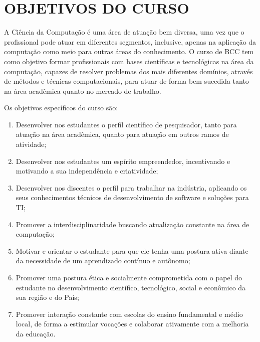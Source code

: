 \chapter{OBJETIVOS DO CURSO}

A Ciência da Computação é uma área de atuação bem diversa, uma vez que o profissional pode atuar em diferentes segmentos, inclusive, apenas na aplicação da computação como meio para outras áreas do conhecimento. O curso de BCC tem como objetivo formar profissionais com bases científicas e tecnológicas na área da computação, capazes de resolver problemas dos mais diferentes domínios, através de métodos e técnicas computacionais, para atuar de forma bem sucedida tanto na área acadêmica quanto no mercado de trabalho. 

Os objetivos específicos do curso são:

\begin{enumerate}
    \item Desenvolver nos estudantes o perfil científico de pesquisador, tanto para atuação na área acadêmica, quanto para atuação em outros ramos de atividade;
    \item Desenvolver nos estudantes um espírito empreendedor, incentivando e motivando a sua independência e criatividade;
    \item Desenvolver nos discentes o perfil para trabalhar na indústria, aplicando os seus conhecimentos técnicos de desenvolvimento de software e soluções para TI;
    \item Promover a interdisciplinaridade buscando atualização constante na área de computação;
    \item Motivar e orientar o estudante para que ele tenha uma postura ativa diante da necessidade de um aprendizado contínuo e autônomo;
    \item Promover uma postura ética e socialmente comprometida com o papel do estudante no desenvolvimento científico, tecnológico, social e econômico da sua região e do País;
    \item Promover interação constante com escolas do ensino fundamental e médio local, de forma a estimular vocações e colaborar ativamente com a melhoria da educação.
    
\end{enumerate}
